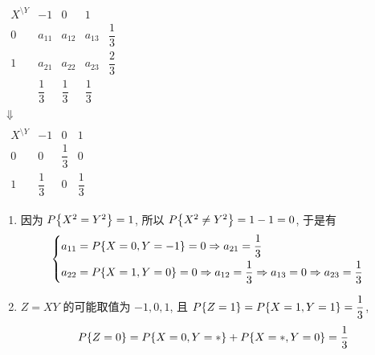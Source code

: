 \begin{solution}
    \begin{minipage}{0.28\linewidth}
        $\begin{matrix}
                \begin{array}{c|cccc}
                    X^{\displaystyle\setminus Y} & -1           & 0            & 1                           \\ \hline
                    0                            & a_{11}       & a_{12}       & a_{13}       & \dfrac{1}{3} \\[6pt]
                    1                            & a_{21}       & a_{22}       & a_{23}       & \dfrac{2}{3} \\[6pt]
                                                 & \dfrac{1}{3} & \dfrac{1}{3} & \dfrac{1}{3}
                \end{array} \\
                \Downarrow                                                                                        \\
                \begin{array}{c|cccc}
                    X^{\displaystyle\setminus Y} & -1           & 0            & 1                        \\ \hline
                    0                            & 0            & \dfrac{1}{3} & 0            & ~~~~~~~~~ \\[6pt]
                    1                            & \dfrac{1}{3} & 0            & \dfrac{1}{3}
                \end{array}
            \end{matrix}$
    \end{minipage}\hfill
    \begin{minipage}{0.68\linewidth}
        \begin{enumerate}[label=(\arabic{*})]
            \item 因为 $P\qty{X^2=Y^2}=1$, 所以 $P\qty{X^2\neq Y^2}=1-1=0$, 于是有
                  $$\begin{cases}
                          a_{11}=P\qty{X=0,Y=-1}=0\Rightarrow a_{21}=\dfrac{1}{3} \\[6pt]
                          a_{22}=P\qty{X=1,Y=0}=0\Rightarrow a_{12}=\dfrac{1}{3}\Rightarrow a_{13}=0\Rightarrow a_{23}=\dfrac{1}{3}
                      \end{cases}$$
            \item $Z=XY$ 的可能取值为 $-1,0,1$, 且 $P\qty{Z=1}=P\qty{X=1,Y=1}=\dfrac{1}{3}$, $$P\qty{Z=0}=P\qty{X=0,Y=*}+P\qty{X=*,Y=0}=\dfrac{1}{3}$$

\end{enumerate}
\end{minipage}
\end{solution}
